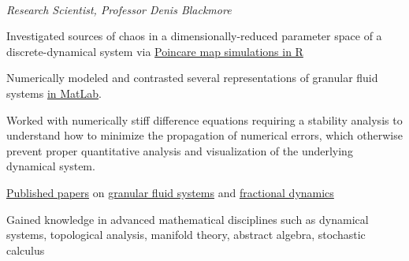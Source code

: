 \\  
\vspace{-0.8em}
\textit{Research Scientist, Professor Denis Blackmore} 
\begin{itemize*}
  \item
    Investigated sources of chaos in a 
    dimensionally-reduced parameter space of a discrete-dynamical system via
    \href{http://kevin-urban.com/video/R__gamma-var_restitution-0.8.gif}{Poincare
    map simulations in R} 
  \item
    Numerically modeled and contrasted several representations of granular fluid systems
    \href{http://www.kevin-urban.com/images/gran_tapping-pics.png}{in
    MatLab}. 
  \item Worked with numerically stiff difference equations requiring a stability
    analysis to understand how to minimize the propagation of numerical errors, which otherwise
    prevent proper quantitative analysis and visualization of the underlying dynamical system.
  \item
    \href{http://msp.org/jomms/2011/6-1/jomms-v6-n1-p06-s.pdf}{Published
    papers} on
    \href{http://www.sciencedirect.com/science/article/pii/S0167278914000189}{granular
    fluid systems} and 
    \href{http://www.icmp.lviv.ua/journal/zbirnyk.64/}{fractional
    dynamics} 
  \item
    Gained knowledge in advanced mathematical disciplines such as
    dynamical systems, topological analysis, manifold theory, abstract
    algebra, stochastic calculus
\end{itemize*}



